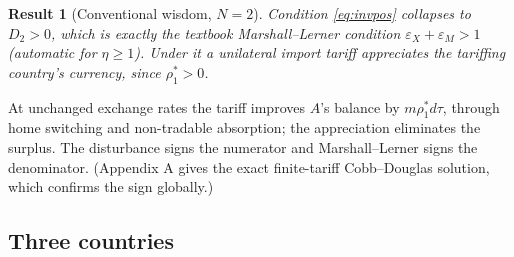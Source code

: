 \documentclass[11pt]{article}
\newtheorem{result}{Result}[section]
\begin{document}
\begin{result}[Conventional wisdom, $N=2$]
Condition \eqref{eq:invpos} collapses to $D_2 > 0$, which is exactly the textbook Marshall--Lerner condition $\varepsilon_X + \varepsilon_M > 1$ (automatic for $\eta \geq 1$). Under it a unilateral import tariff appreciates the tariffing country's currency, since $\rho_1^* > 0$.
\label{res:2c}
\end{result}

\noindent At unchanged exchange rates the tariff improves $A$'s balance by $m\rho_1^* d\tau$, through home switching and non-tradable absorption; the appreciation eliminates the surplus. The disturbance signs the numerator and Marshall--Lerner signs the denominator. (Appendix A gives the exact finite-tariff Cobb--Douglas solution, which confirms the sign globally.)

\subsection{Three countries}
\end{document}
